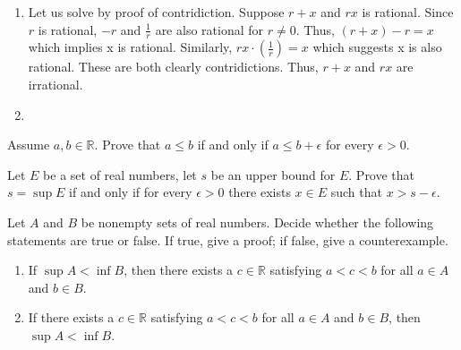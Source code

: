 \documentclass[12pt,letterpaper,boxed]{hmcpset}
\begin{document}
\begin{solution}
\begin{enumerate}
	\itemsep0em
	\item Let us solve by proof of contridiction. Suppose $r + x$ and $rx$ is rational. Since $r$ is rational, $-r$ and \(\frac{1}{r}\) are also rational for $r \neq 0$. Thus, $(r + x) - r = x$ which implies x is rational. 
	Similarly, $rx \cdot (\frac{1}{r}) = x$ which suggests x is also rational. These are both clearly contridictions. Thus, $r + x$ and $rx$ are irrational.
	\item 
\end{enumerate}
\end{solution}

\begin{problem}[Exercise 4.8.]
Assume $a, b \in \mathbb{R}.$ Prove that $a \leq b$ if and only if $a \leq b + \epsilon$ for every $\epsilon > 0.$
\end{problem}

\begin{solution}
\end{solution}

\begin{problem}[Exercise 4.9.]
Let $E$ be a set of real numbers, let $s$ be an upper bound for $E$. Prove that $s = \sup E$ if and only if for every $\epsilon > 0$ there exists $x \in E$ such that $x > s - \epsilon.$
\end{problem}

\begin{solution}
\end{solution}

\begin{problem}[Exercise 4.10.]
Let $A$ and $B$ be nonempty sets of real numbers. Decide whether the following statements are true or false. If true, give a proof; if false, give a counterexample.
\begin{enumerate}
	\itemsep0em
	\item If $\sup A < \inf B$, then there exists a $c \in \mathbb{R}$ satisfying $a < c < b$ for all $a \in A$ and $b \in B$.
	\item If there exists a $c\in \mathbb{R}$ satisfying $a < c < b$ for all $a \in A$ and $b \in B$, then $\sup A < \inf B$.
\end{enumerate}
\end{problem}

\begin{solution}
\end{solution}
\end{document}
